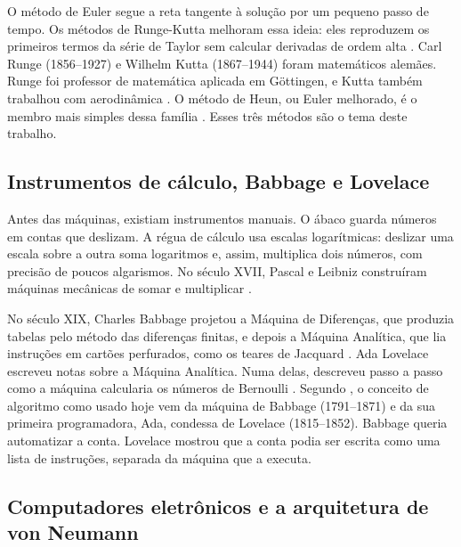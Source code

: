 O método de Euler segue a reta tangente à solução por um pequeno passo de tempo. Os métodos de Runge-Kutta melhoram essa ideia: eles reproduzem os primeiros termos da série de Taylor sem calcular derivadas de ordem alta \cite[seção~10.3]{aquino2020}. Carl Runge (1856--1927) e Wilhelm Kutta (1867--1944) foram matemáticos alemães. Runge foi professor de matemática aplicada em Göttingen, e Kutta também trabalhou com aerodinâmica \cite[p.~182]{aquino2020}. O método de Heun, ou Euler melhorado, é o membro mais simples dessa família \cite[seção~10.2]{aquino2020}. Esses três métodos são o tema deste trabalho.

\subsection{Instrumentos de cálculo, Babbage e Lovelace}

Antes das máquinas, existiam instrumentos manuais. O ábaco guarda números em contas que deslizam. A régua de cálculo usa escalas logarítmicas: deslizar uma escala sobre a outra soma logaritmos e, assim, multiplica dois números, com precisão de poucos algarismos. No século XVII, Pascal e Leibniz construíram máquinas mecânicas de somar e multiplicar \cite{isaacson2014}.

No século XIX, Charles Babbage projetou a Máquina de Diferenças, que produzia tabelas pelo método das diferenças finitas, e depois a Máquina Analítica, que lia instruções em cartões perfurados, como os teares de Jacquard \cite{isaacson2014}. Ada Lovelace escreveu notas sobre a Máquina Analítica. Numa delas, descreveu passo a passo como a máquina calcularia os números de Bernoulli \cite{isaacson2014}. Segundo \textcite[p.~51]{aquino2020}, o conceito de algoritmo como usado hoje vem da máquina de Babbage (1791--1871) e da sua primeira programadora, Ada, condessa de Lovelace (1815--1852). Babbage queria automatizar a conta. Lovelace mostrou que a conta podia ser escrita como uma lista de instruções, separada da máquina que a executa.

\subsection{Computadores eletrônicos e a arquitetura de von Neumann}

